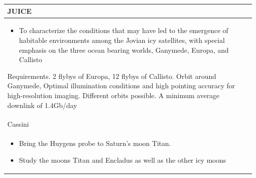 \begin{longtable}{p{\textwidth}}
  JUICE \\* \midrule

  \begin{itemize}
  \item To characterize the conditions that may have led to the
    emergence of habitable environments among the Jovian icy
    satellites, with special emphasis on the three ocean bearing
    worlds, Ganymede, Europa, and Callisto
  \end{itemize}

  Requirements. 2 flybys of Europa, 12 flybys of Callisto. Orbit
  around Ganymede, Optimal illumination conditions and high pointing
  accuracy for high-resolution imaging. Different orbits possible. A
  minimum average downlink of 1.4Gb/day \\

  Cassini \\* \midrule

  \begin{itemize}
  \item Bring the Huygens probe to Saturn’s moon Titan.
  \item Study the moons Titan and Encladus as well as the other icy
    moons
  \end{itemize} \\ \bottomrule
\end{longtable}

